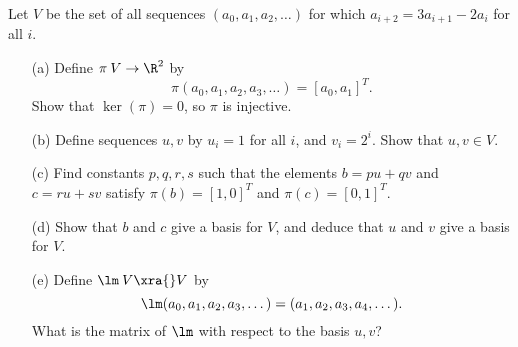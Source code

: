 \begin{exercise}\label{ex-recurrence}
 Let $V$ be the set of all sequences $(a_0,a_1,a_2,\dotsc)$ for
 which $a_{i+2}=3a_{i+1}-2a_i$ for all $i$.
 \begin{itemize}
  \item[(a)] Define $\pi\:V\to\R^2$ by
   \[ \pi(a_0,a_1,a_2,a_3,\dotsc) = [a_0,a_1]^T. \]
   Show that $\ker(\pi)=0$, so $\pi$ is injective.
  \item[(b)] Define sequences $u,v$ by $u_i=1$ for all $i$, and
  $v_i=2^i$.  Show that $u,v\in V$.
  \item[(c)] Find constants $p,q,r,s$ such that the elements
  $b=pu+qv$ and $c=ru+sv$ satisfy $\pi(b)=[1,0]^T$ and
  $\pi(c)=[0,1]^T$.
  \item[(d)] Show that $b$ and $c$ give a basis for $V$, and
   deduce that $u$ and $v$ give a basis for $V$.
  \item[(e)] Define $\lm\:V\xra{}V$ by
   \[ \lm(a_0,a_1,a_2,a_3,\dotsc) =
         (a_1,a_2,a_3,a_4,\dotsc).
   \]
   What is the matrix of $\lm$ with respect to the basis $u,v$?
 \end{itemize}
\end{exercise}
